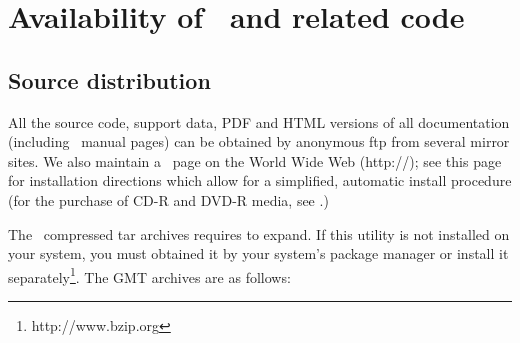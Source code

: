 %
%
\chapter{Availability of \gmt\ and related code}
\label{app:D}
\thispagestyle{headings}

\section{Source distribution}
All the source code, support data, PDF
and HTML versions of all documentation (including \UNIX\
manual pages) can be obtained by anonymous
ftp from several mirror sites.  We also maintain a \GMT\
page on the World Wide Web (http://\GMTSITE);
see this page for installation directions 
which allow for a simplified, automatic install procedure
(for the purchase of CD-R and DVD-R media, see .)

The \GMT\ compressed tar archives requires \progname{bzip2} to expand.  If this utility
is not installed on your system, you must obtained it by your system's package manager
or install it separately\footnote{http://www.bzip.org}.
The GMT archives are as follows:


